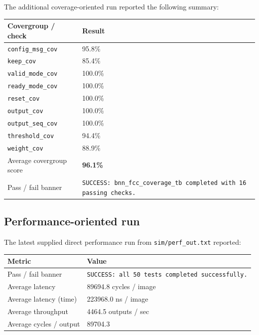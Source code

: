 \documentclass[11pt]{article}
\begin{document}
The additional coverage-oriented run reported the following summary:

\begin{center}
\begin{tabularx}{\textwidth}{@{}lY@{}}
\toprule
Covergroup / check & Result \\
\midrule
\texttt{config\_msg\_cov} & 95.8\% \\
\texttt{keep\_cov} & 85.4\% \\
\texttt{valid\_mode\_cov} & 100.0\% \\
\texttt{ready\_mode\_cov} & 100.0\% \\
\texttt{reset\_cov} & 100.0\% \\
\texttt{output\_cov} & 100.0\% \\
\texttt{output\_seq\_cov} & 100.0\% \\
\texttt{threshold\_cov} & 94.4\% \\
\texttt{weight\_cov} & 88.9\% \\
Average covergroup score & \textbf{96.1\%} \\
Pass / fail banner & \texttt{SUCCESS: bnn\_fcc\_coverage\_tb completed with 16 passing checks.} \\
\bottomrule
\end{tabularx}
\end{center}

\subsection{Performance-oriented run}
\label{sec:perf}

The latest supplied direct performance run from \texttt{sim/perf\_out.txt} reported:

\begin{center}
\begin{tabularx}{\textwidth}{@{}lY@{}}
\toprule
Metric & Value \\
\midrule
Pass / fail banner & \texttt{SUCCESS: all 50 tests completed successfully.} \\
Average latency & 89694.8 cycles / image \\
Average latency (time) & 223968.0 ns / image \\
Average throughput & 4464.5 outputs / sec \\
Average cycles / output & 89704.3 \\
\bottomrule
\end{tabularx}
\end{center}
\end{document}
